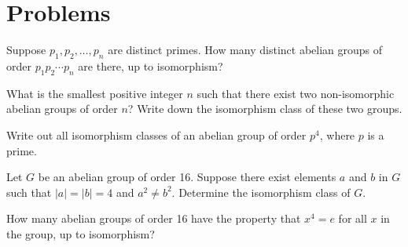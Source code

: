 \section{Problems}
\begin{problem}
    Suppose $p_1, p_2, \dots, p_n$ are distinct primes. How many distinct abelian groups of order $p_1p_2\cdots p_n$ are there, up to isomorphism?
\end{problem}

\begin{problem}
    What is the smallest positive integer $n$ such that there exist two non-isomorphic abelian groups of order $n$? Write down the isomorphism class of these two groups.
\end{problem}

\begin{problem}
    Write out all isomorphism classes of an abelian group of order $p^4$, where $p$ is a prime.
\end{problem}

\begin{problem}
    Let $G$ be an abelian group of order 16. Suppose there exist elements $a$ and $b$ in $G$ such that $|a| = |b| = 4$ and $a^2 \neq b^2$. Determine the isomorphism class of $G$.
\end{problem}

\begin{problem}
    How many abelian groups of order 16 have the property that $x^4 = e$ for all $x$ in the group, up to isomorphism?
\end{problem}
